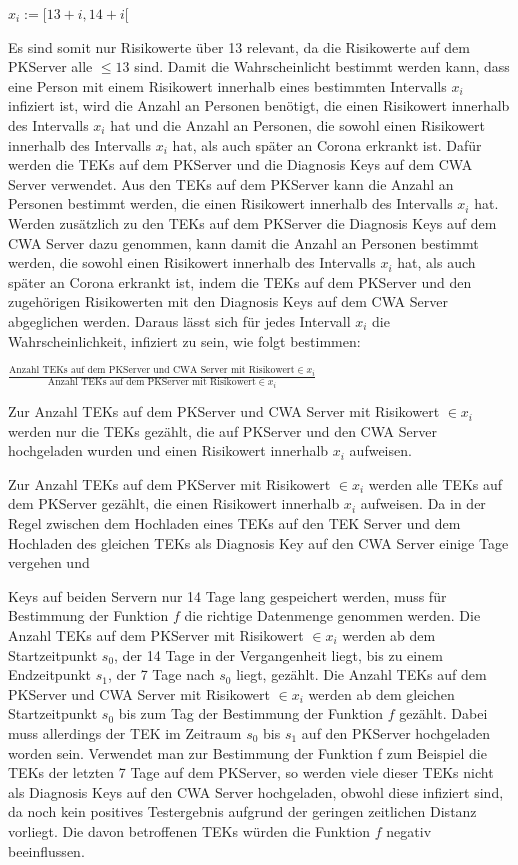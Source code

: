\documentclass[conference]{IEEEtran}
\begin{document}
\centerline{\text{ }}
\centerline{$x_i := [13+i, 14+i[$}
\centerline{\text{ }}

Es sind somit nur Risikowerte über 13 relevant, da die Risikowerte auf dem PKServer alle $\le 13$ sind. 
Damit die Wahrscheinlicht bestimmt werden kann, dass eine Person mit einem Risikowert innerhalb eines bestimmten Intervalls $x_i$ infiziert ist, 
wird die Anzahl an Personen benötigt, die einen Risikowert innerhalb des Intervalls $x_i$ hat und die Anzahl an Personen, 
die sowohl einen Risikowert innerhalb des Intervalls $x_i$ hat, als auch später an Corona erkrankt ist. 
Dafür werden die TEKs auf dem PKServer und die Diagnosis Keys auf dem CWA Server verwendet. Aus den TEKs auf dem PKServer kann die Anzahl an Personen bestimmt werden,
die einen Risikowert innerhalb des Intervalls $x_i$ hat.
Werden zusätzlich zu den TEKs auf dem PKServer die Diagnosis Keys auf dem CWA Server dazu genommen, 
kann damit die Anzahl an Personen bestimmt werden, die sowohl einen Risikowert innerhalb des Intervalls $x_i$ hat, als auch später an Corona erkrankt ist, 
indem die TEKs auf dem PKServer und den zugehörigen Risikowerten mit den Diagnosis Keys auf dem CWA Server abgeglichen werden. 
Daraus lässt sich für jedes Intervall $x_i$ die Wahrscheinlichkeit, infiziert zu sein, wie folgt bestimmen:

\centerline{\text{ }}
\centerline{$\frac{\text{Anzahl TEKs auf dem PKServer und CWA Server mit Risikowert} \in x_i}{\text{Anzahl TEKs auf dem PKServer mit Risikowert} \in x_i}$}
\centerline{\text{ }}

Zur Anzahl TEKs auf dem PKServer und CWA Server mit Risikowert $\in x_i$ werden nur die TEKs gezählt, 
die auf PKServer und den CWA Server hochgeladen wurden und einen Risikowert innerhalb $x_i$ aufweisen. 

Zur Anzahl TEKs auf dem PKServer mit Risikowert  $\in x_i$  werden alle TEKs auf dem PKServer gezählt, die einen Risikowert innerhalb $x_i$ aufweisen.
Da in der Regel zwischen dem Hochladen eines TEKs auf den TEK Server und dem Hochladen des gleichen TEKs als Diagnosis Key auf den CWA Server einige Tage vergehen und 

Keys auf beiden Servern nur 14 Tage lang gespeichert werden, muss für Bestimmung der Funktion $f$ die richtige Datenmenge genommen werden. 
Die Anzahl TEKs auf dem PKServer mit Risikowert  $\in x_i$ werden ab dem Startzeitpunkt $s_0$, der 14 Tage in der Vergangenheit liegt, bis zu einem Endzeitpunkt $s_1$, 
der 7 Tage nach $s_0$ liegt, gezählt. Die Anzahl TEKs auf dem PKServer und
CWA Server mit Risikowert $\in x_i$ werden ab dem gleichen Startzeitpunkt $s_0$ bis zum Tag der Bestimmung der Funktion $f$ gezählt.
Dabei muss allerdings der TEK im Zeitraum $s_0$ bis $s_1$ auf den PKServer hochgeladen worden sein. 
Verwendet man zur Bestimmung der Funktion f zum Beispiel die TEKs der letzten 7 Tage auf dem PKServer, 
so werden viele dieser TEKs nicht als Diagnosis Keys auf den CWA Server hochgeladen, 
obwohl diese infiziert sind, da noch kein positives Testergebnis aufgrund der geringen zeitlichen Distanz vorliegt. 
Die davon betroffenen TEKs würden die Funktion $f$ negativ beeinflussen.
\end{document}
